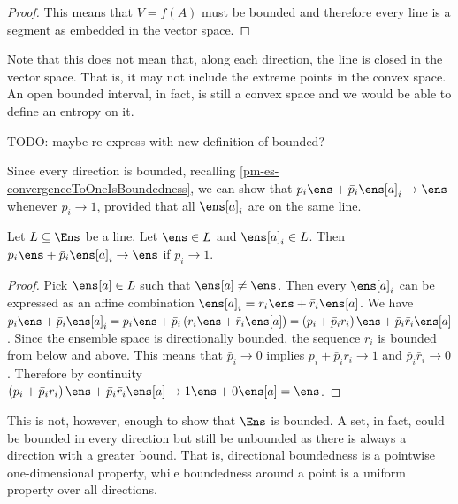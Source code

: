 \begin{mathSection}
\begin{proof}
	This means that $V = f(A)$ must be bounded and therefore every line is a segment as embedded in the vector space.
\end{proof}

\begin{remark}
	Note that this does not mean that, along each direction, the line is closed in the vector space. That is, it may not include the extreme points in the convex space. An open bounded interval, in fact, is still a convex space and we would be able to define an entropy on it.
\end{remark}
\end{mathSection}

TODO: maybe re-express with new definition of bounded?

Since every direction is bounded, recalling \ref{pm-es-convergenceToOneIsBoundedness}, we can show that $p_i \ens + \bar{p}_i \ens[a]_i \to \ens$ whenever $p_i \to 1$, provided that all $\ens[a]_i$ are on the same line.

\begin{mathSection}
	\begin{prop}
		Let $L \subseteq \Ens$ be a line. Let $\ens \in L$ and $\ens[a]_i \in L$. Then $p_i \ens + \bar{p}_i \ens[a]_i \to \ens$ if $p_i \to 1$.
	\end{prop}
	
	\begin{proof}
		Pick $\ens[a] \in L$ such that $\ens[a] \neq \ens$. Then every $\ens[a]_i$ can be expressed as an affine combination $\ens[a]_i = r_i \ens + \bar{r}_i \ens[a]$. We have $p_i \ens + \bar{p}_i \ens[a]_i = p_i \ens + \bar{p}_i \left( r_i \ens + \bar{r}_i \ens[a] \right) = \left( p_i + \bar{p}_i r_i \right) \ens + \bar{p}_i\bar{r}_i \ens[a]$. Since the ensemble space is directionally bounded, the sequence $r_i$ is bounded from below and above. This means that $\bar{p}_i \to 0$ implies $p_i + \bar{p}_i r_i \to 1$ and $\bar{p}_i\bar{r}_i \to 0$. Therefore by continuity $\left( p_i + \bar{p}_i r_i \right) \ens + \bar{p}_i\bar{r}_i \ens[a] \to 1 \ens + 0 \ens[a] = \ens$.
	\end{proof}
\end{mathSection}
This is not, however, enough to show that $\Ens$ is bounded. A set, in fact, could be bounded in every direction but still be unbounded as there is always a direction with a greater bound. That is, directional boundedness is a pointwise one-dimensional property, while boundedness around a point is a uniform property over all directions.

